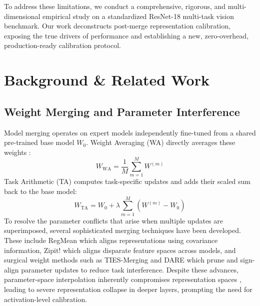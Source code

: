 \documentclass{article}
\theoremstyle{plain}
\theoremstyle{definition}
\theoremstyle{remark}
\begin{document}
To address these limitations, we conduct a comprehensive, rigorous, and multi-dimensional empirical study on a standardized ResNet-18 multi-task vision benchmark. Our work deconstructs post-merge representation calibration, exposing the true drivers of performance and establishing a new, zero-overhead, production-ready calibration protocol.

\section{Background \& Related Work}
\label{sec:related}
\subsection{Weight Merging and Parameter Interference}
Model merging operates on expert models independently fine-tuned from a shared pre-trained base model $W_0$. Weight Averaging (WA) directly averages these weights \cite{Matena2021, Wortsman2022, Choshen2022, Ainsworth2022}:
\begin{equation}
    W_{\text{WA}} = \frac{1}{M} \sum_{m=1}^{M} W^{(m)}
\end{equation}
Task Arithmetic (TA) \cite{Ilharco2022a, Ilharco2022b} computes task-specific updates and adds their scaled sum back to the base model:
\begin{equation}
    W_{\text{TA}} = W_0 + \lambda \sum_{m=1}^{M} (W^{(m)} - W_0)
\end{equation}
To resolve the parameter conflicts that arise when multiple updates are superimposed, several sophisticated merging techniques have been developed. These include RegMean \cite{Jin2022} which aligns representations using covariance information, Zipit! \cite{Stoica2023} which aligns disparate feature spaces across models, and surgical weight methods such as TIES-Merging \cite{Yadav2023} and DARE \cite{Yu2024} which prune and sign-align parameter updates to reduce task interference. Despite these advances, parameter-space interpolation inherently compromises representation spaces \cite{OrtizJimenez2023, Gueta2023}, leading to severe representation collapse in deeper layers, prompting the need for activation-level calibration.
\end{document}
